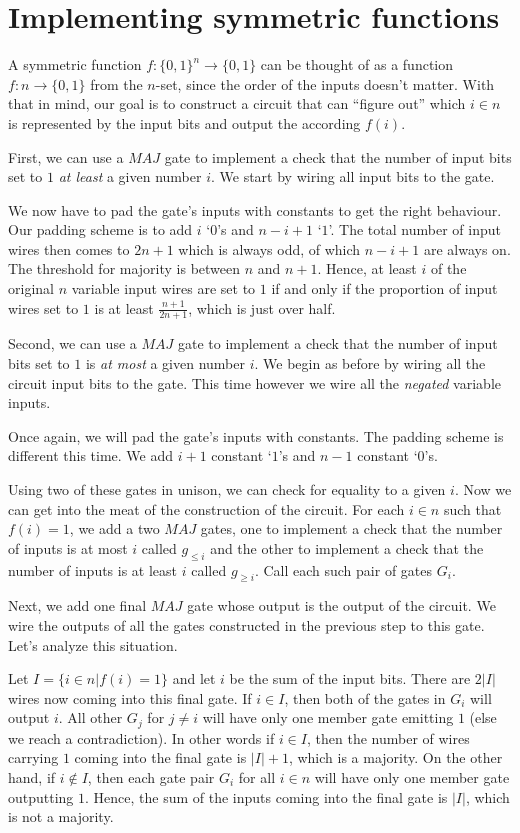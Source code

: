 \documentclass[11pt,letterpaper]{article}
\begin{document}
\section{Implementing symmetric functions}

A symmetric function $f : \{0, 1\}^n \to \{0, 1\}$ can be thought of as a
function $f : n \to \{0, 1\}$ from the $n$-set, since the order of the inputs
doesn't matter. With that in mind, our goal is to construct a circuit that can
``figure out'' which $i \in n$ is represented by the input bits and output the
according $f(i)$.

First, we can use a $MAJ$ gate to implement a check that the number of input
bits set to $1$ \emph{at least} a given number $i$. We start by wiring all
input bits to the gate.

We now have to pad the gate's inputs with constants to get the right behaviour.
Our padding scheme is to add $i$ `$0$'s and $n - i + 1$ `$1$'. The total number
of input wires then comes to $2n + 1$ which is always odd, of which $n - i + 1$
are always on. The threshold for majority is between $n$ and $n+1$. Hence, at
least $i$ of the original $n$ variable input wires are set to $1$ if and only
if the proportion of input wires set to $1$ is at least $\frac{n + 1}{2n + 1}$,
which is just over half.

Second, we can use a $MAJ$ gate to implement a check that the number of input
bits set to $1$ is \emph{at most} a given number $i$. We begin as before by
wiring all the circuit input bits to the gate. This time however we wire all
the \emph{negated} variable inputs.

Once again, we will pad the gate's inputs with constants. The padding scheme is
different this time. We add $i + 1$ constant `$1$'s and $n - 1$ constant
`$0$'s.

Using two of these gates in unison, we can check for equality to a given $i$.
Now we can get into the meat of the construction of the circuit. For each $i
\in n$ such that $f(i) = 1$, we add a two $MAJ$ gates, one to implement a check
that the number of inputs is at most $i$ called $g_{\leq i}$ and the other to
implement a check that the number of inputs is at least $i$ called
$g_{\geq i}$. Call each such pair of gates $G_i$.

Next, we add one final $MAJ$ gate whose output is the output of the circuit. We
wire the outputs of all the gates constructed in the previous step to this
gate. Let's analyze this situation.

Let $I = \{i \in n | f(i) = 1\}$ and let $i$ be the sum of the input bits.
There are $2|I|$ wires now coming into this final gate.
If $i \in I$, then both of the gates in $G_i$ will output $i$. All other $G_j$
for $j \neq i$ will have only one member gate emitting $1$ (else we reach a
contradiction). In other words if $i \in I$, then the number of wires carrying
$1$ coming into the final gate is $|I| + 1$, which is a majority.
On the other hand, if $i \notin I$, then each gate pair $G_i$ for all $i \in n$
will have only one member gate outputting $1$. Hence, the sum of the inputs
coming into the final gate is $|I|$, which is not a majority.
\end{document}
